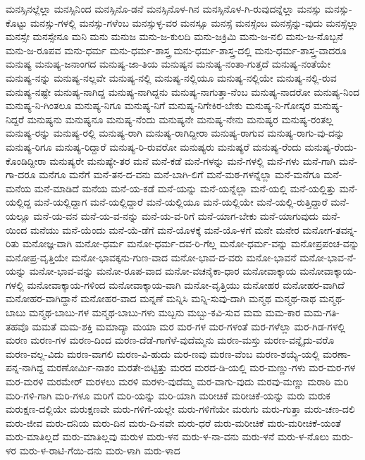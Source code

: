 {ಮನಸ್ಸಿನಲ್ಲೆಲ್ಲಾ
ಮನಸ್ಸಿನಿಂದ
ಮನಸ್ಸಿನೊ-ಡನೆ
ಮನಸ್ಸಿನೊಳ-ಗಿನ
ಮನಸ್ಸಿನೊಳ-ಗಿ-ರುವುದನ್ನೆಲ್ಲಾ
ಮನಸ್ಸು
ಮನಸ್ಸು-ಕೊಟ್ಟು
ಮನಸ್ಸು-ಗಳಲ್ಲಿ
ಮನಸ್ಸು-ಗಳೆಂಬ
ಮನಸ್ಸುಳ್ಳ-ವರ
ಮನಸ್ಸೂ
ಮನಸ್ಸೆ
ಮನಸ್ಸೆಂಬ
ಮನಸ್ಸೆನ್ನು-ವುದು
ಮನಸ್ಸೆಲ್ಲಾ
ಮನಸ್ಸೇ
ಮನಸ್ಸೇನೂ
ಮನಿ
ಮನು
ಮನುಜ
ಮನು-ಜ-ಕುಲದಿ
ಮನು-ಜಕ್ರಿಮಿ
ಮನು-ಜ-ನಲಿ
ಮನು-ಜ-ನೊಬ್ಬನೆ
ಮನು-ಜ-ರೂಪವ
ಮನು-ಧರ್ಮ
ಮನು-ಧರ್ಮ-ಶಾಸ್ತ್ರ
ಮನು-ಧರ್ಮ-ಶಾಸ್ತ್ರ-ದಲ್ಲಿ
ಮನು-ಧರ್ಮ-ಶಾಸ್ತ್ರ-ವಾದರೂ
ಮನುಷ್ಯ
ಮನುಷ್ಯ-ಜನಾಂಗದ
ಮನುಷ್ಯ-ಜಾ-ತಿಯ
ಮನುಷ್ಯನ
ಮನುಷ್ಯ-ನಂತಾ-ಗುತ್ತದೆ
ಮನುಷ್ಯ-ನಂತೆಯೇ
ಮನುಷ್ಯ-ನನ್ನು
ಮನುಷ್ಯ-ನಲ್ಲವೇ
ಮನುಷ್ಯ-ನಲ್ಲಿ
ಮನುಷ್ಯ-ನಲ್ಲಿಯೂ
ಮನುಷ್ಯ-ನಲ್ಲಿಯೇ
ಮನುಷ್ಯ-ನಲ್ಲಿ-ರುವ
ಮನುಷ್ಯ-ನಷ್ಟೇ
ಮನುಷ್ಯ-ನಾಗಿದ್ದ
ಮನುಷ್ಯ-ನಾಗಿದ್ದನು
ಮನುಷ್ಯ-ನಾಗುತ್ತಾ-ನೆಂಬ
ಮನುಷ್ಯ-ನಾದರೋ
ಮನುಷ್ಯ-ನಿಂದ
ಮನುಷ್ಯ-ನಿ-ಗಿಂತಲೂ
ಮನುಷ್ಯ-ನಿಗೂ
ಮನುಷ್ಯ-ನಿಗೆ
ಮನುಷ್ಯ-ನಿಗೇಕಿರ-ಬೇಕು
ಮನುಷ್ಯ-ನಿ-ಗೋಸ್ಕರ
ಮನುಷ್ಯ-ನಿದ್ದರೆ
ಮನುಷ್ಯನು
ಮನುಷ್ಯನೂ
ಮನುಷ್ಯ-ನೆಂದು
ಮನುಷ್ಯನೇ
ಮನುಷ್ಯ-ನೇನು
ಮನುಷ್ಯರ
ಮನುಷ್ಯ-ರಂತಲ್ಲ
ಮನುಷ್ಯ-ರನ್ನು
ಮನುಷ್ಯ-ರಲ್ಲಿ
ಮನುಷ್ಯ-ರಾಗಿ
ಮನುಷ್ಯ-ರಾಗಿದ್ದೀರಾ
ಮನುಷ್ಯ-ರಾಗುವ
ಮನುಷ್ಯ-ರಾಗು-ವು-ದನ್ನು
ಮನುಷ್ಯ-ರಿಗೂ
ಮನುಷ್ಯ-ರಿದ್ದಾರೆ
ಮನುಷ್ಯ-ರಿ-ರುವರೋ
ಮನುಷ್ಯರು
ಮನುಷ್ಯರೆ
ಮನುಷ್ಯ-ರೆಂದು
ಮನುಷ್ಯ-ರೆಂದು-ಕೊಂಡಿದ್ದೀರಾ
ಮನುಷ್ಯರೇ
ಮನುಷ್ಯೇ-ತರ
ಮನೆ
ಮನೆ-ಕಡೆ
ಮನೆ-ಗಳನ್ನು
ಮನೆ-ಗಳಲ್ಲಿ
ಮನೆ-ಗಳು
ಮನೆ-ಗಾಗಿ
ಮನೆ-ಗಾ-ದರೂ
ಮನೆಗೂ
ಮನೆಗೆ
ಮನೆ-ತನ-ದ-ವನು
ಮನೆ-ಬಾಗಿ-ಲಿಗೆ
ಮನೆ-ಮಠ-ಗಳನ್ನೆಲ್ಲಾ
ಮನೆ-ಮನೆಗೂ
ಮನೆ-ಮನೆಯ
ಮನೆ-ಮಾಡಿದೆ
ಮನೆಯ
ಮನೆ-ಯ-ಕಡೆ
ಮನೆ-ಯನ್ನು
ಮನೆ-ಯನ್ನೆಲ್ಲಾ
ಮನೆ-ಯಲ್ಲಿ
ಮನೆ-ಯಲ್ಲಿತ್ತು
ಮನೆ-ಯಲ್ಲಿದ್ದ
ಮನೆ-ಯಲ್ಲಿದ್ದಾಗ
ಮನೆ-ಯಲ್ಲಿದ್ದಾರೆ
ಮನೆ-ಯಲ್ಲಿಯೂ
ಮನೆ-ಯಲ್ಲಿಯೇ
ಮನೆ-ಯಲ್ಲಿ-ರುತ್ತಿದ್ದಾರೆ
ಮನೆ-ಯಲ್ಲೂ
ಮನೆ-ಯ-ವನ
ಮನೆ-ಯ-ವ-ನನ್ನು
ಮನೆ-ಯ-ವ-ರಿಗೆ
ಮನೆ-ಯಾಗ-ಬೇಕು
ಮನೆ-ಯಾಗುವುದು
ಮನೆ-ಯಿಂದ
ಮನೆಯು
ಮನೆ-ಯೆಂದು
ಮನೆ-ಯೆ-ಡೆಗೆ
ಮನೆ-ಯೊಳಕ್ಕೆ
ಮನೆ-ಯೊ-ಳಗೆ
ಮನೇ
ಮನೇರ
ಮನೋಗ-ತವನ್ನ-ರಿತು
ಮನೋಜ್ಞ-ವಾಗಿ
ಮನೋ-ಧರ್ಮ
ಮನೋ-ಧರ್ಮ-ದವ-ರಿ-ಗೆಲ್ಲ
ಮನೋ-ಧರ್ಮ-ವನ್ನು
ಮನೋಪ್ರಪಂಚ-ವನ್ನು
ಮನೋಪ್ರ-ವೃತ್ತಿಯೇ
ಮನೋ-ಭಾವಕ್ಕನು-ಗುಣ-ವಾದ
ಮನೋ-ಭಾವ-ದ-ವರು
ಮನೋ-ಭಾವನೆ
ಮನೋ-ಭಾವ-ನೆ-ಯನ್ನು
ಮನೋ-ಭಾವ-ವನ್ನು
ಮನೋ-ರೂಪ-ವಾದ
ಮನೋ-ವಚನೈಕಾ-ಧಾರ
ಮನೋವಾಕ್ಕಾಯ
ಮನೋವಾಕ್ಕಾಯ-ಗಳಲ್ಲಿ
ಮನೋವಾಕ್ಕಾಯ-ಗಳಿಂದ
ಮನೋವಾಕ್ಕಾಯ-ವಾಗಿ
ಮನೋ-ವೃತ್ತಿಯು
ಮನೋಹರ
ಮನೋಹರ-ವಾಗಿದೆ
ಮನೋಹರ-ವಾಗಿದ್ದಾನೆ
ಮನೋಹರ-ವಾದ
ಮನ್ನಣೆ
ಮನ್ನಿಸಿ
ಮನ್ನಿ-ಸುವು-ದಾಗಿ
ಮನ್ಮಥ
ಮನ್ಮಥ-ನಾಥ
ಮನ್ಮಥ-ಬಾಬು
ಮನ್ಮಥ-ಬಾಬು-ಗಳ
ಮನ್ಮಥ-ಬಾಬು-ಗಳು
ಮಬ್ಬನು
ಮಬ್ಬು-ಕವಿ-ಸುವ
ಮಮ
ಮಮ-ಕಾರ
ಮಮ-ಗತಿ-ತಹವೊ
ಮಮತೆ
ಮಮ-ಶಕ್ತಿ
ಮಮಾದ್ಯಾ
ಮಯಾ
ಮರ
ಮರ-ಗಳ
ಮರ-ಗಳಂತೆ
ಮರ-ಗಳೆಲ್ಲಾ
ಮರ-ಗಿಡ-ಗಳಲ್ಲಿ
ಮರಣ
ಮರಣ-ಗಳ
ಮರಣ-ದಿಂದ
ಮರಣ-ದೆಡೆ-ಗಾಗೆಳೆ-ವುದೆಮ್ಮನು
ಮರಣ-ಮಸ್ತು
ಮರಣ-ವನ್ನೈದು-ವರೊ
ಮರಣ-ವಲ್ಲ-ವಿದು
ಮರಣ-ವಾಗಲಿ
ಮರಣ-ವಿ-ಹುದು
ಮರ-ಣವು
ಮರಣ-ವೆಂಬ
ಮರಣ-ಶಯ್ಯೆ-ಯಲ್ಲಿ
ಮರಣಾ-ಪನ್ನ-ನಾಗಿದ್ದ
ಮರಣೋರ್ಮಿ-ನಾಶಂ
ಮರತೇ-ಬಿಟ್ಟಿತ್ತು
ಮರದ
ಮರದ-ಡಿ-ಯಲ್ಲಿ
ಮರ-ಮಣ್ಣು-ಗಳು
ಮರ-ಮರ-ಗಳ
ಮರ-ಮರಳಿ
ಮರಮೇರ್
ಮರಳಲು
ಮರಳಿ
ಮರಳು-ವುದೆಮ್ಮ
ಮರ-ವಾಗು-ವುದು
ಮರವು-ಮಣ್ಣು
ಮರಾಠಿ
ಮರಿ
ಮರಿ-ಗಳಿ-ಗಾಗಿ
ಮರಿ-ಗಳೂ
ಮರಿಗೆ
ಮರಿ-ಯನ್ನು
ಮರಿ-ಯಾಗಿ
ಮರೀಚಿಕೆ
ಮರೀಚಿಕೆ-ಯನ್ನು
ಮರು
ಮರುಕ
ಮರುಕ್ಷಣ-ದಲ್ಲಿಯೇ
ಮರುಕ್ಷಣವೇ
ಮರು-ಗಳಿಗೆ-ಯಲ್ಲೇ
ಮರು-ಗಳಿಗೆಯೇ
ಮರುಗು
ಮರು-ಗುತ್ತಾ
ಮರು-ಚಣ-ದಲಿ
ಮರು-ಜೀವ
ಮರು-ದನಿಯ
ಮರು-ದಿನ
ಮರು-ದಿ-ನವೇ
ಮರು-ಧರೆ
ಮರು-ಮರೀಚಿಕೆ
ಮರು-ಮರೀಚಿಕೆ-ಯಂತೆ
ಮರು-ಮಾತಿಲ್ಲದೆ
ಮರು-ಮಾತಿಲ್ಲವು
ಮರುಳ
ಮರು-ಳನ
ಮರು-ಳ-ನಾ-ವನು
ಮರು-ಳನೆ
ಮರು-ಳ-ನೊಲು
ಮರು-ಳರ
ಮರು-ಳ-ರಾಟಿ-ಗೆಯಿ-ದನು
ಮರು-ಳಾಗಿ
ಮರು-ಳಾದ
}
